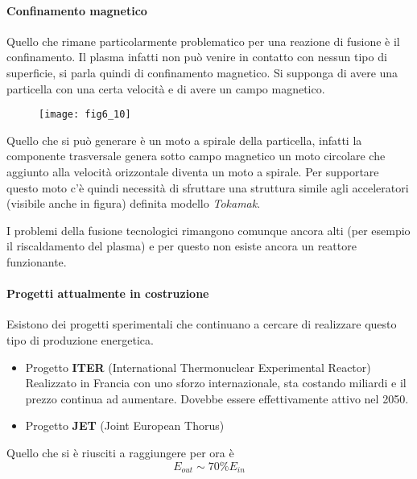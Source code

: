 \paragraph{Confinamento magnetico}
Quello che rimane particolarmente problematico per una reazione di fusione è il confinamento.
Il plasma infatti non può venire in contatto con nessun tipo di superficie, si parla quindi di confinamento magnetico.
Si supponga di avere una particella con una certa velocità e di avere un campo magnetico.
\begin{figure}[h]
\centering
\texttt{[image: fig6\_10]}
\end{figure}

Quello che si può generare è un moto a spirale della particella, infatti la componente trasversale genera sotto campo magnetico un moto circolare che aggiunto alla velocità orizzontale diventa un moto a spirale.
Per supportare questo moto c'è quindi necessità di sfruttare una struttura simile agli acceleratori (visibile anche in figura) definita modello \emph{Tokamak}.

I problemi della fusione tecnologici rimangono comunque ancora alti (per esempio il riscaldamento del plasma) e per questo non esiste ancora un reattore funzionante. 

\paragraph{Progetti attualmente in costruzione}
Esistono dei progetti sperimentali che continuano a cercare di realizzare questo tipo di produzione energetica.
\begin{itemize}
\item Progetto \textbf{ITER} (International Thermonuclear Experimental Reactor) Realizzato in Francia con uno sforzo internazionale, sta costando miliardi e il prezzo continua ad aumentare. 
Dovebbe essere effettivamente attivo nel 2050.
\item Progetto \textbf{JET} (Joint European Thorus)
\end{itemize}
Quello che si è riusciti a raggiungere per ora è
\[
E_{out}\sim 70\% E_{in}
\] 

